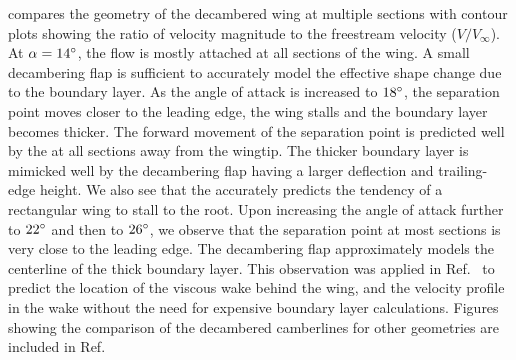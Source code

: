  compares the geometry of the decambered wing at multiple sections with contour plots showing the ratio of velocity magnitude to the freestream velocity ($V/V_\infty$). At $\alpha=14^\circ{}$, the flow is mostly attached at all sections of the wing.
A small decambering flap is sufficient to accurately model the effective shape change due to the boundary layer. As the angle of attack is increased to $18^\circ{}$, the separation point moves closer to the leading edge, the wing stalls and the boundary layer becomes thicker. The forward movement of the separation point is predicted well by the \methodname at all sections away from the wingtip. The thicker boundary layer is mimicked well by the decambering flap having a larger deflection and trailing-edge height. We also see that the \methodname accurately predicts the tendency of a rectangular wing to stall to the root. Upon increasing the angle of attack further to $22^\circ{}$ and then to $26^\circ{}$, we observe that the separation point at most sections is very close to the leading edge. The decambering flap approximately models the centerline of the thick boundary layer.
This observation was applied in Ref.~\cite{Hosangadi2018} to predict the location of the viscous wake behind the wing, and the velocity profile in the wake without the need for expensive boundary layer calculations. %
Figures showing the comparison of the decambered camberlines for other geometries are included in Ref. \cite{PranavThesis}
